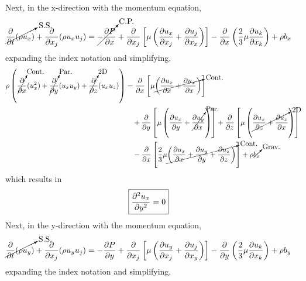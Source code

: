 Next, in the x-direction with the momentum equation,
\begin{align*}
    \cancelto{\text{S.S.}}{\frac{\partial}{\partial t} (\rho u_x)} + \frac{\partial}{\partial x_j} (\rho u_x u_j) &= \cancelto{\text{C.P.}}{-\frac{\partial P}{\partial x}} + \frac{\partial}{\partial x_j} \left[\mu \left( \frac{\partial u_x}{\partial x_j} + \frac{\partial u_j}{\partial x_x} \right) \right] - \frac{\partial}{\partial x} \left(\frac{2}{3} \mu \frac{\partial u_k}{\partial x_k} \right) + \rho b_x
\end{align*}
expanding the index notation and simplifying,
\begin{align*}
    \rho \left(\cancelto{\text{Cont.}}{\frac{\partial}{\partial x}} (u_x^2) + \cancelto{\text{Par.}}{\frac{\partial}{\partial y}} (u_x u_y) + \cancelto{\text{2D}}{\frac{\partial}{\partial z}} (u_x u_z) \right) &=  \frac{\partial}{\partial x} \left[\mu \cancelto{\text{Cont.}}{\left(\frac{\partial u_x}{\partial x} + \frac{\partial u_x}{\partial x} \right)} \right] \\
    &\quad + \frac{\partial}{\partial y} \left[\mu \left(\frac{\partial u_x}{\partial y} + \cancelto{\text{Par.}}{\frac{\partial u_y}{\partial x}} \right) \right] + \frac{\partial}{\partial z} \left[\mu \left(\cancelto{\text{2D}}{\frac{\partial u_x}{\partial z} + \frac{\partial u_z}{\partial x}} \right) \right] \\
    &\quad - \frac{\partial}{\partial x} \left[\frac{2}{3} \mu \cancelto{\text{Cont.}}{\left(\frac{\partial u_x}{\partial x} + \frac{\partial u_y}{\partial y} + \frac{\partial u_z}{\partial z} \right)} \right] + \rho \cancelto{\text{Grav.}}{b_x}
\end{align*}
which results in 
\begin{align*}
    \Aboxed{\frac{\partial^2 u_x}{\partial y^2} &= 0}
\end{align*}
Next, in the y-direction with the momentum equation,
\begin{align*}
    \cancelto{\text{S.S.}}{\frac{\partial}{\partial t} (\rho u_y)} + \frac{\partial}{\partial x_j} (\rho u_y u_j) &= -\frac{\partial P}{\partial y} + \frac{\partial}{\partial x_j} \left[\mu \left( \frac{\partial u_y}{\partial x_j} + \frac{\partial u_j}{\partial x_y} \right) \right] - \frac{\partial}{\partial y} \left(\frac{2}{3} \mu \frac{\partial u_k}{\partial x_k} \right) + \rho b_y
\end{align*}
expanding the index notation and simplifying,

